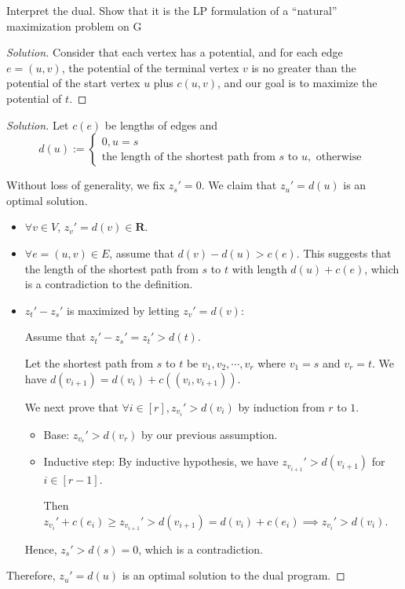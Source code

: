     \begin{thm}{}{}
        Interpret the dual. Show that it is the LP formulation of a ``natural'' maximization problem on G
    \end{thm}
    
    \begin{proof}[Solution]
        Consider that each vertex has a potential, and for each edge $e=(u,v)$, 
        the potential of the terminal vertex $v$ is no greater than the potential of the start vertex $u$ plus $c(u, v)$, 
        and our goal is to maximize the potential of $t$. 
    \end{proof}

    \newpage
    
    \begin{proof}[Solution]
        Let $c(e)$ be lengths of edges and 
        $$d(u) := \begin{cases}
        0, u = s \\
        \text{the length of the shortest path from } s \text{ to } u, \text{ otherwise }
        \end{cases}$$
        
        Without loss of generality, we fix $z_s' = 0$. We claim that $z_u' = d(u)$ is an optimal solution. 
        \begin{itemize}
            \item $\forall v \in V$, $z_v' = d(v) \in \mathbf R $.
            \item $\forall e = (u, v) \in E$, assume that $d(v) - d(u) > c(e)$. This suggests that the length of the shortest path from $s$ to $t$ with length $d(u) + c(e)$, which is a contradiction to the definition.
            \item $z_t' - z_s'$ is maximized by letting $z_v' = d(v)$:
            
            Assume that $z_t' - z_s' = z_t' > d(t)$.
            
            Let the shortest path from $s$ to $t$ be $v_1, v_2, \cdots , v_r$ where $v_1 = s$ and $v_r = t$. We have $d(v_{i+1}) = d(v_i) + c((v_i, v_{i+1}))$.
            
            We next prove that $\forall i \in [r], z_{v_i}' > d({v_i})$ by induction from $r$ to $1$.
            \begin{itemize}
                \item Base: $z_{v_r}' > d(v_r)$ by our previous assumption.
                \item Inductive step: By inductive hypothesis, we have $z_{v_{i+1}}' > d(v_{i+1})$ for $i \in [r - 1]$.
                
                Then $z_{v_i}' + c(e_i) \ge z_{v_{i+1}}' > d(v_{i+1}) = d(v_i) + c(e_i) \implies z_{v_i}' > d(v_i)$.
            \end{itemize}
            
            Hence, $z_s' > d(s) = 0$, which is a contradiction.
        \end{itemize}
        
        Therefore, $z_u' = d(u)$ is an optimal solution to the dual program.
    \end{proof}


